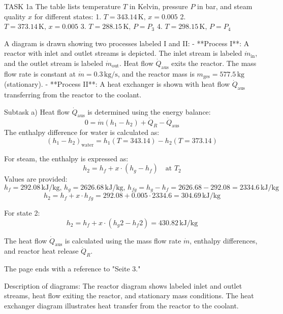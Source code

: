 TASK 1a  
The table lists temperature \( T \) in Kelvin, pressure \( P \) in bar, and steam quality \( x \) for different states:  
1. \( T = 343.14 \, \text{K}, \, x = 0.005 \)  
2. \( T = 373.14 \, \text{K}, \, x = 0.005 \)  
3. \( T = 288.15 \, \text{K}, \, P = P_3 \)  
4. \( T = 298.15 \, \text{K}, \, P = P_4 \)  

A diagram is drawn showing two processes labeled I and II:  
- **Process I**: A reactor with inlet and outlet streams is depicted. The inlet stream is labeled \( \dot{m}_{\text{in}} \), and the outlet stream is labeled \( \dot{m}_{\text{out}} \). Heat flow \( \dot{Q}_{\text{aus}} \) exits the reactor. The mass flow rate is constant at \( \dot{m} = 0.3 \, \text{kg/s} \), and the reactor mass is \( m_{\text{ges}} = 577.5 \, \text{kg} \) (stationary).  
- **Process II**: A heat exchanger is shown with heat flow \( \dot{Q}_{\text{aus}} \) transferring from the reactor to the coolant.  

Subtask a) Heat flow \( \dot{Q}_{\text{aus}} \) is determined using the energy balance:  
\[
0 = \dot{m} (h_1 - h_2) + \dot{Q}_R - \dot{Q}_{\text{aus}}
\]  
The enthalpy difference for water is calculated as:  
\[
(h_1 - h_2)_{\text{water}} = h_1(T = 343.14) - h_2(T = 373.14)
\]  

For steam, the enthalpy is expressed as:  
\[
h_2 = h_f + x \cdot (h_g - h_f) \quad \text{at } T_2
\]  
Values are provided:  
\[
h_f = 292.08 \, \text{kJ/kg}, \, h_g = 2626.68 \, \text{kJ/kg}, \, h_{fg} = h_g - h_f = 2626.68 - 292.08 = 2334.6 \, \text{kJ/kg}
\]  
\[
h_2 = h_f + x \cdot h_{fg} = 292.08 + 0.005 \cdot 2334.6 = 304.69 \, \text{kJ/kg}
\]  

For state 2:  
\[
h_2 = h_f + x \cdot (h_g2 - h_f2) = 430.82 \, \text{kJ/kg}
\]  

The heat flow \( \dot{Q}_{\text{aus}} \) is calculated using the mass flow rate \( \dot{m} \), enthalpy differences, and reactor heat release \( \dot{Q}_R \).  

The page ends with a reference to "Seite 3."  

Description of diagrams:  
The reactor diagram shows labeled inlet and outlet streams, heat flow exiting the reactor, and stationary mass conditions. The heat exchanger diagram illustrates heat transfer from the reactor to the coolant.  

